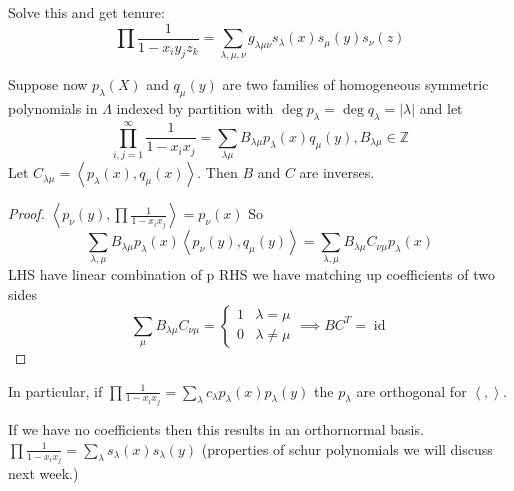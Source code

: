 \documentclass{report}
\newcommand{\Z}{\mathbb{Z}}
\def \id {\operatorname{id}}
\newcommand{\inner}[2]{\left\langle #1, #2\right\rangle}
\theoremstyle{definition}
\theoremstyle{remark}
\numberwithin{equation}{section}
\begin{document}
Solve this and get tenure:
\[
\prod \frac{1}{1 - x_iy_jz_k} = \sum_{\lambda, \mu, \nu}g_{\lambda\mu\nu}s_\lambda(x)s_\mu(y)s_\nu(z)    
\]

Suppose now $p_\lambda(X)$ and $q_\mu(y)$ are two families of homogeneous symmetric polynomials in $\Lambda$ indexed by partition with $\deg p_\lambda = \deg q_\lambda = |\lambda|$ and let
\[
    \prod_{i,j = 1}^\infty \frac{1}{1 - x_ix_j} = \sum_{\lambda\mu}B_{\lambda\mu}p_\lambda(x)q_\mu(y), B_{\lambda\mu} \in \Z 
\] Let $C_{\lambda\mu} = \inner{p_\lambda(x)}{q_\mu(x)}$. Then $B$ and $C$ are inverses.

\begin{proof}
    $\inner{p_\nu(y)}{\prod \frac{1}{1 - x_ix_j}} = p_\nu(x)$
    So \[
        \sum_{\lambda, \mu} B_{\lambda\mu}p_\lambda(x)\inner{p_\nu(y)}{q_\mu(y)}
        =  \sum_{\lambda, \mu} B_{\lambda\mu} C_{\nu\mu} p_\lambda(x)
    \]
    LHS have linear combination of p RHS we have
    matching up coefficients of two sides \[
        \sum_\mu B_{\lambda\mu}C_{\nu\mu} = \begin{cases}
            1 & \lambda = \mu \\
            0 & \lambda \neq \mu
        \end{cases}  \implies BC^T = \id
    \]
\end{proof}

In particular, if $\prod \frac{1}{1 - x_ix_j} = \sum_{\lambda} c_\lambda p_\lambda(x)p_\lambda(y)$ the $p_\lambda$ are orthogonal for $\inner{}{}$.

If we have no coefficients then this results in an orthornormal basis.
$\prod \frac{1}{1 - x_ix_j} = \sum_{\lambda}s_\lambda(x)s_\lambda(y)$ (properties of schur polynomials we will discuss next week.)
\end{document}
